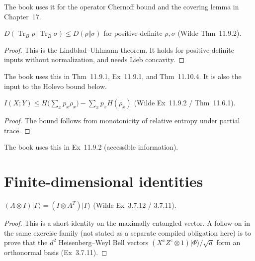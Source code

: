 The book uses it for the operator Chernoff bound and the covering lemma in
Chapter~17.

\begin{theorem}
  \label{thm:relEnt_ptrace_le}
  $D(\operatorname{Tr}_B\rho\Vert\operatorname{Tr}_B\sigma)\le D(\rho\Vert\sigma)$
  for positive-definite $\rho,\sigma$ (Wilde Thm~11.9.2).
\end{theorem}

\begin{proof}
  This is the Lindblad--Uhlmann theorem. It holds for positive-definite inputs
  without normalization, and needs Lieb concavity.
\end{proof}

The book uses this in Thm~11.9.1, Ex~11.9.1, and Thm~11.10.4. It is also the
input to the Holevo bound below.

\begin{theorem}
  \label{thm:holevo_bound}
  $I(X;Y)\le H\bigl(\sum_x p_x\rho_x\bigr)-\sum_x p_x H(\rho_x)$
  (Wilde Ex~11.9.2 / Thm~11.6.1).
\end{theorem}

\begin{proof}
  The bound follows from monotonicity of relative entropy under partial trace.
\end{proof}

The book uses this in Ex~11.9.2 (accessible information).

\chapter{Finite-dimensional identities}

\begin{theorem}
  \label{thm:transpose_trick}
  $(A\otimes I)\lvert\Gamma\rangle = (I\otimes A^T)\lvert\Gamma\rangle$
  (Wilde Ex~3.7.12 / 3.7.11).
\end{theorem}

\begin{proof}
  This is a short identity on the maximally entangled vector. A follow-on in
  the same exercise family (not stated as a separate compiled obligation here)
  is to prove that the $d^2$ Heisenberg--Weyl Bell vectors
  $(X^x Z^z \otimes 1)\lvert\Phi\rangle/\sqrt{d}$ form an orthonormal basis
  (Ex~3.7.11).
\end{proof}

